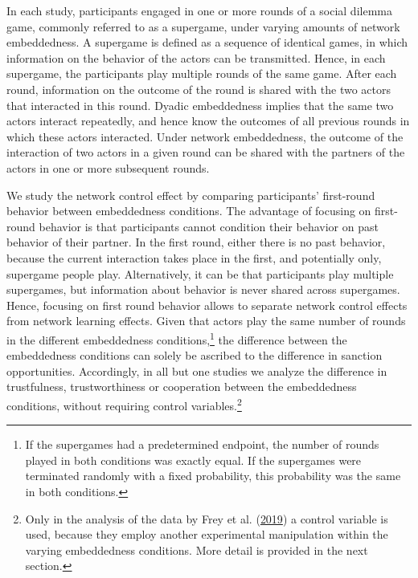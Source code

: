 \documentclass[
  11pt,
]{article}
\begin{document}
In each study, participants engaged in one or more rounds of a social dilemma game, commonly referred to as a supergame, under varying amounts of network embeddedness.
A supergame is defined as a sequence of identical games, in which information on the behavior of the actors can be transmitted.
Hence, in each supergame, the participants play multiple rounds of the same game.
After each round, information on the outcome of the round is shared with the two actors that interacted in this round.
Dyadic embeddedness implies that the same two actors interact repeatedly, and hence know the outcomes of all previous rounds in which these actors interacted.
Under network embeddedness, the outcome of the interaction of two actors in a given round can be shared with the partners of the actors in one or more subsequent rounds.

We study the network control effect by comparing participants' first-round behavior between embeddedness conditions.
The advantage of focusing on first-round behavior is that participants cannot condition their behavior on past behavior of their partner.
In the first round, either there is no past behavior, because the current interaction takes place in the first, and potentially only, supergame people play.
Alternatively, it can be that participants play multiple supergames, but information about behavior is never shared across supergames.
Hence, focusing on first round behavior allows to separate network control effects from network learning effects.
Given that actors play the same number of rounds in the different embeddedness conditions,\footnote{
  If the supergames had a predetermined endpoint, the number of rounds played in both conditions was exactly equal. If the supergames were terminated randomly with a fixed probability, this probability was the same in both conditions.}
the difference between the embeddedness conditions can solely be ascribed to the difference in sanction opportunities.
Accordingly, in all but one studies we analyze the difference in trustfulness, trustworthiness or cooperation between the embeddedness conditions, without requiring control variables.\footnote{Only in the analysis of the data by Frey et al. (\protect\hyperlink{ref-frey_buskens_investments_2019}{2019}) a control variable is used, because they employ another experimental manipulation within the varying embeddedness conditions. More detail is provided in the next section.}
\end{document}
